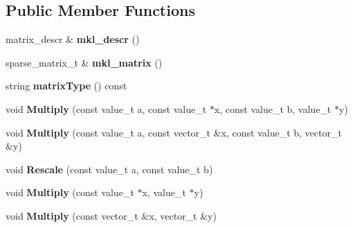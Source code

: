 \subsection*{Public Member Functions}
\begin{DoxyCompactItemize}
\item 
matrix\+\_\+descr \& {\bfseries mkl\+\_\+descr} ()\hypertarget{class_sparse_matrix_type_a1f7a6765acd2ec4fae312ca786962cb9}{}\label{class_sparse_matrix_type_a1f7a6765acd2ec4fae312ca786962cb9}

\item 
sparse\+\_\+matrix\+\_\+t \& {\bfseries mkl\+\_\+matrix} ()\hypertarget{class_sparse_matrix_type_afd47d85a1c895de018cad84451058355}{}\label{class_sparse_matrix_type_afd47d85a1c895de018cad84451058355}

\item 
string {\bfseries matrix\+Type} () const \hypertarget{class_sparse_matrix_type_a5ead28b39f8dfc7688f58b8d39808ef0}{}\label{class_sparse_matrix_type_a5ead28b39f8dfc7688f58b8d39808ef0}

\item 
void {\bfseries Multiply} (const value\+\_\+t a, const value\+\_\+t $\ast$x, const value\+\_\+t b, value\+\_\+t $\ast$y)\hypertarget{class_sparse_matrix_type_ab74d341617d12ed6363db59ee2c7e042}{}\label{class_sparse_matrix_type_ab74d341617d12ed6363db59ee2c7e042}

\item 
void {\bfseries Multiply} (const value\+\_\+t a, const vector\+\_\+t \&x, const value\+\_\+t b, vector\+\_\+t \&y)\hypertarget{class_sparse_matrix_type_af7f5d4236ce2a15d3bc329565f3451cf}{}\label{class_sparse_matrix_type_af7f5d4236ce2a15d3bc329565f3451cf}

\item 
void {\bfseries Rescale} (const value\+\_\+t a, const value\+\_\+t b)\hypertarget{class_sparse_matrix_type_ab99343fb6362ff317669d441c43ab50f}{}\label{class_sparse_matrix_type_ab99343fb6362ff317669d441c43ab50f}

\item 
void {\bfseries Multiply} (const value\+\_\+t $\ast$x, value\+\_\+t $\ast$y)\hypertarget{class_sparse_matrix_type_a3e9ab505f48edce77949dc16f8899674}{}\label{class_sparse_matrix_type_a3e9ab505f48edce77949dc16f8899674}

\item 
void {\bfseries Multiply} (const vector\+\_\+t \&x, vector\+\_\+t \&y)\hypertarget{class_sparse_matrix_type_a7157dab30596a1907e797910039479db}{}\label{class_sparse_matrix_type_a7157dab30596a1907e797910039479db}


\end{DoxyCompactItemize}
